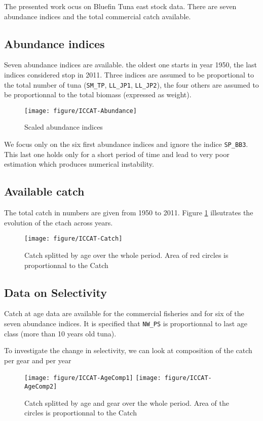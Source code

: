 The presented  work ocus on  Bluefin Tuna  east stock data.  There are
seven abundance indices and the total commercial catch available. 





\subsection{Abundance indices}

Seven abundance indices are available.   the oldest one starts in year
1950,  the last  indices considered  stop in  2011. Three  indices are
assumed to be proportional to  the total number of tuna (\verb+SM_TP+,
\verb+LL_JP1+,  \verb+LL_JP2+),  the four  others  are  assumed to  be
proportionnal to the total biomass (expressed as weight).

\begin{center}
  \begin{figure}
  \texttt{[image: figure/ICCAT-Abundance]} 
  \caption{Scaled abundance indices }
  \end{figure}
\end{center}

We focus only on the six first abundance indices and ignore the indice \verb+SP_BB3+. 
This last one holds only for a short period of time and lead to very poor estimation which produces numerical instability. 



\subsection{Available catch}
The  total catch  in  numbers  are given  from  1950  to 2011.  Figure
\ref{fig:TotCatch} illsutrates the evolution of the ctach across years.
\begin{center}
  \begin{figure}
  \texttt{[image: figure/ICCAT-Catch]} 
  \caption{Catch  splitted by  age over  the whole  period. Area  of red
  circles is proportionnal to the Catch}
  \label{fig:TotCatch}
  \end{figure}
\end{center}

\subsection{Data on Selectivity}
Catch at age  data are available for the commercial  fisheries and for
six of the seven abundance  indices. It is specified that \verb+NW_PS+
is proportionnal to last age class (more than 10 years old tuna).






To investigate the  change in selectivity, we can  look at composition
of the catch per gear and per year
  \begin{figure}
  \texttt{[image: figure/ICCAT-AgeComp1]} 
  \texttt{[image: figure/ICCAT-AgeComp2]} 
  \caption{Catch splitted by age and gear over the whole period. Area of the
	circles is proportionnal to the Catch}
  \end{figure}




